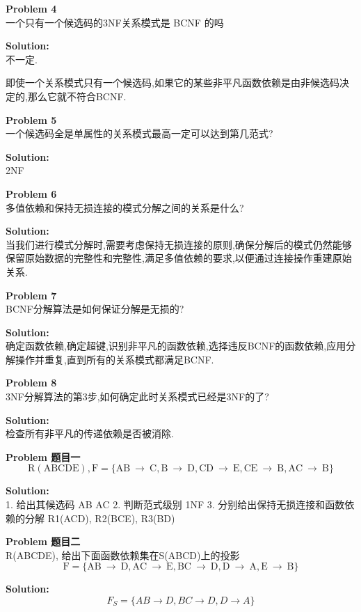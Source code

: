 \documentclass[12pt]{article} %
\newenvironment{problem}[2][Problem]
    { \begin{mdframed}[backgroundcolor=gray!20] \textbf{#1 #2} \\}
    {  \end{mdframed}}
\newenvironment{solution}
    { \begin{mdframed} \textbf{Solution:} \\}
    {  \end{mdframed}}
\begin{document}
\begin{problem}{4}
一个只有一个候选码的3NF关系模式是 BCNF 的吗
\end{problem}
\begin{solution}
不一定.

即使一个关系模式只有一个候选码,如果它的某些非平凡函数依赖是由非候选码决定的,那么它就不符合BCNF.
\end{solution}

\begin{problem}{5}
一个候选码全是单属性的关系模式最高一定可以达到第几范式?
\end{problem}
\begin{solution}
2NF
\end{solution}

\begin{problem}{6}
多值依赖和保持无损连接的模式分解之间的关系是什么?
\end{problem}
\begin{solution}
当我们进行模式分解时,需要考虑保持无损连接的原则,确保分解后的模式仍然能够保留原始数据的完整性和完整性,满足多值依赖的要求,以便通过连接操作重建原始关系.
\end{solution}

\begin{problem}{7}
BCNF分解算法是如何保证分解是无损的?
\end{problem}
\begin{solution}
确定函数依赖,确定超键,识别非平凡的函数依赖,选择违反BCNF的函数依赖,应用分解操作并重复,直到所有的关系模式都满足BCNF.
\end{solution}

\begin{problem}{8}
3NF分解算法的第3步,如何确定此时关系模式已经是3NF的了?
\end{problem}
\begin{solution}
检查所有非平凡的传递依赖是否被消除.
\end{solution}

\begin{problem}{题目一}
\[  
\mathrm{R(ABCDE),F=\{AB~\to~C,B~\to~D,CD~\to~E,CE~\to~B,AC~\to~B\}}
\]
\end{problem}
\begin{solution}
1.	给出其候选码 AB AC 
2.	判断范式级别 1NF
3.	分别给出保持无损连接和函数依赖的分解 R1(ACD), R2(BCE), R3(BD)
\end{solution}

\begin{problem}{题目二}
R(ABCDE), 给出下面函数依赖集在S(ABCD)上的投影
\[\mathrm{F=\{AB~\to~D,AC~\to~E,BC~\to~D,D~\to~A,E~\to~B\}}\]
\end{problem}
\begin{solution}
\[F_S=\{AB\to D,BC\to D,D\to A\}\]
\end{solution}
\end{document}
